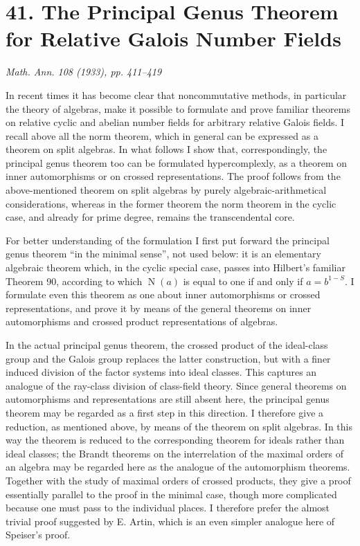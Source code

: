 \documentclass[11pt]{article}
\providecommand{\Norm}{\operatorname{N}}
\begin{document}
\clearpage

\section*{41. The Principal Genus Theorem for Relative Galois Number Fields}

\begin{center}
\emph{Math. Ann. 108 (1933), pp. 411--419}
\end{center}

In recent times it has become clear that noncommutative methods, in particular the theory of algebras, make it possible to formulate and prove familiar theorems on relative cyclic and abelian number fields for arbitrary relative Galois fields. I recall above all the norm theorem, which in general can be expressed as a theorem on split algebras. In what follows I show that, correspondingly, the principal genus theorem too can be formulated hypercomplexly, as a theorem on inner automorphisms or on crossed representations. The proof follows from the above-mentioned theorem on split algebras by purely algebraic-arithmetical considerations, whereas in the former theorem the norm theorem in the cyclic case, and already for prime degree, remains the transcendental core.

For better understanding of the formulation I first put forward the principal genus theorem ``in the minimal sense'', not used below: it is an elementary algebraic theorem which, in the cyclic special case, passes into Hilbert's familiar Theorem 90, according to which \(\Norm(a)\) is equal to one if and only if \(a=b^{1-S}\). I formulate even this theorem as one about inner automorphisms or crossed representations, and prove it by means of the general theorems on inner automorphisms and crossed product representations of algebras.

In the actual principal genus theorem, the crossed product of the ideal-class group and the Galois group replaces the latter construction, but with a finer induced division of the factor systems into ideal classes. This captures an analogue of the ray-class division of class-field theory. Since general theorems on automorphisms and representations are still absent here, the principal genus theorem may be regarded as a first step in this direction. I therefore give a reduction, as mentioned above, by means of the theorem on split algebras. In this way the theorem is reduced to the corresponding theorem for ideals rather than ideal classes; the Brandt theorems on the interrelation of the maximal orders of an algebra may be regarded here as the analogue of the automorphism theorems. Together with the study of maximal orders of crossed products, they give a proof essentially parallel to the proof in the minimal case, though more complicated because one must pass to the individual places. I therefore prefer the almost trivial proof suggested by E. Artin, which is an even simpler analogue here of Speiser's proof.
\end{document}
